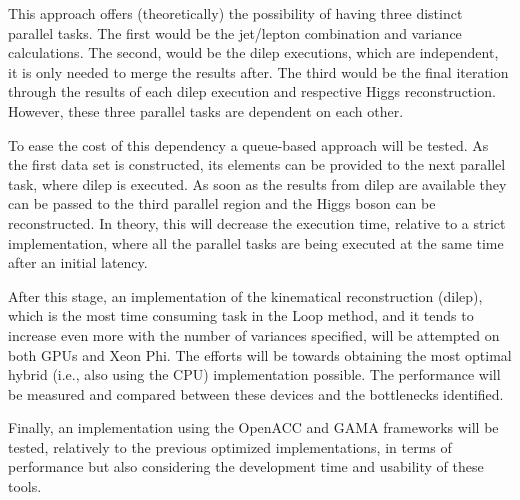 This approach offers (theoretically) the possibility of having three distinct parallel tasks. The first would be the jet/lepton combination and variance calculations. The second, would be the dilep executions, which are independent, it is only needed to merge the results after. The third would be the final iteration through the results of each dilep execution and respective Higgs reconstruction. However, these three parallel tasks are dependent on each other. 

To ease the cost of this dependency a queue-based approach will be tested. As the first data set is constructed, its elements can be provided to the next parallel task, where dilep is executed. As soon as the results from dilep are available they can be passed to the third parallel region and the Higgs boson can be reconstructed. In theory, this will decrease the execution time, relative to a strict implementation, where all the parallel tasks are being executed at the same time after an initial latency.

After this stage, an implementation of the kinematical reconstruction (dilep), which is the most time consuming task in the Loop method, and it tends to increase even more with the number of variances specified, will be attempted on both GPUs and Xeon Phi. The efforts will be towards obtaining the most optimal hybrid (i.e., also using the CPU) implementation possible. The performance will be measured and compared between these devices and the bottlenecks identified.

Finally, an implementation using the OpenACC and GAMA frameworks will be tested, relatively to the previous optimized implementations, in terms of performance but also considering the development time and usability of these tools.

\newpage
